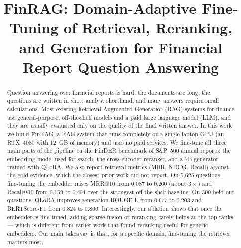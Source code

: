 \documentclass[conference]{IEEEtran}
\begin{document}
\title{FinRAG: Domain-Adaptive Fine-Tuning of Retrieval, Reranking, and Generation for Financial Report Question Answering}

\author{
\and
{}
}

\maketitle

\begin{abstract}
Question answering over financial reports is hard: the documents are long, the questions are
written in short analyst shorthand, and many answers require small calculations. Most existing
Retrieval-Augmented Generation (RAG) systems for finance use general-purpose, off-the-shelf
models and a paid large language model (LLM), and they are usually evaluated only on the quality
of the final written answer. In this work we build FinRAG, a RAG system that runs completely on a
single laptop GPU (an RTX~4080 with 12~GB of memory) and uses no paid services. We fine-tune all
three main parts of the pipeline on the FinDER benchmark of S\&P~500 annual reports: the embedding
model used for search, the cross-encoder reranker, and a 7B generator trained with QLoRA. We also
report retrieval metrics (MRR, NDCG, Recall) against the gold evidence, which the closest prior
work did not report. On 5{,}625 questions, fine-tuning the embedder raises MRR@10 from 0.087 to
0.260 (about $3\times$) and Recall@10 from 0.159 to 0.404 over the strongest off-the-shelf baseline.
On 300 held-out questions, QLoRA improves generation ROUGE-L from 0.077 to 0.203 and BERTScore-F1
from 0.824 to 0.866. Interestingly, our ablation shows that once the embedder is fine-tuned, adding
sparse fusion or reranking barely helps at the top ranks --- which is different from earlier work that
found reranking useful for generic embedders. Our main takeaway is that, for a specific domain,
fine-tuning the retriever matters most.
\end{abstract}
\end{document}
